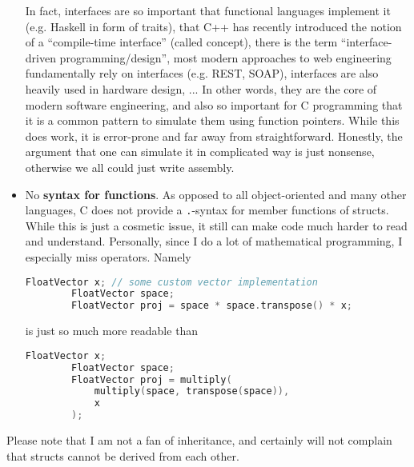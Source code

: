 \documentclass{scrartcl}
\begin{document}
\begin{itemize}
    In fact, interfaces are so important that functional languages implement it (e.g. Haskell in form of traits), that C++ has recently introduced the notion of a ``compile-time interface'' (called concept), there is the term ``interface-driven programming/design'', most modern approaches to web engineering fundamentally rely on interfaces (e.g. REST, SOAP), interfaces are also heavily used in hardware design, ...
    In other words, they are the core of modern software engineering, and also so important for C programming that it is a common pattern to simulate them using function pointers.
    While this does work, it is error-prone and far away from straightforward.
    Honestly, the argument that one can simulate it in complicated way is just nonsense, otherwise we all could just write assembly.
    \item No \textbf{syntax for functions}.
    As opposed to all object-oriented and many other languages, C does not provide a \lstinline{.}-syntax for member functions of structs.
    While this is just a cosmetic issue, it still can make code much harder to read and understand.
    Personally, since I do a lot of mathematical programming, I especially miss operators.
    Namely
    \begin{lstlisting}[language = c]
        FloatVector x; // some custom vector implementation
        FloatVector space;
        FloatVector proj = space * space.transpose() * x;
    \end{lstlisting} 
    is just so much more readable than
    \begin{lstlisting}[language = c]
        FloatVector x;
        FloatVector space;
        FloatVector proj = multiply(
            multiply(space, transpose(space)), 
            x
        );
    \end{lstlisting}
\end{itemize}
Please note that I am not a fan of inheritance, and certainly will not complain that structs cannot be derived from each other.
\end{document}
